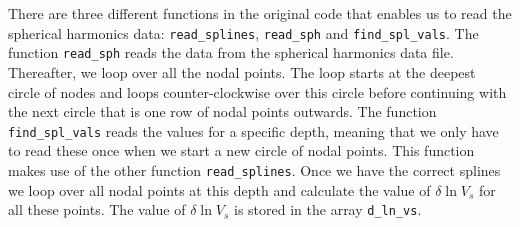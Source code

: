 There are three different functions in the original code that enables us to read 
the spherical harmonics data: \texttt{read\_splines}, \texttt{read\_sph} 
and \texttt{find\_spl\_vals}. The function \texttt{read\_sph} reads the data from the spherical 
harmonics data file. Thereafter, we loop over all the nodal points. The loop starts at the 
deepest circle of nodes and loops counter-clockwise over this circle before continuing with the 
next circle that is one row of nodal points outwards. The function \texttt{find\_spl\_vals} 
reads the values for a specific depth, meaning that we only have to read these once when we 
start a new circle of nodal points. This function makes use of the other function \texttt{read\_splines}. 
Once we have the correct splines we loop over all nodal points at this depth and calculate the 
value of $\delta \ln{V_s}$ for all these points. The value of $\delta \ln{V_s}$ 
is stored in the array \texttt{d\_ln\_vs}.


